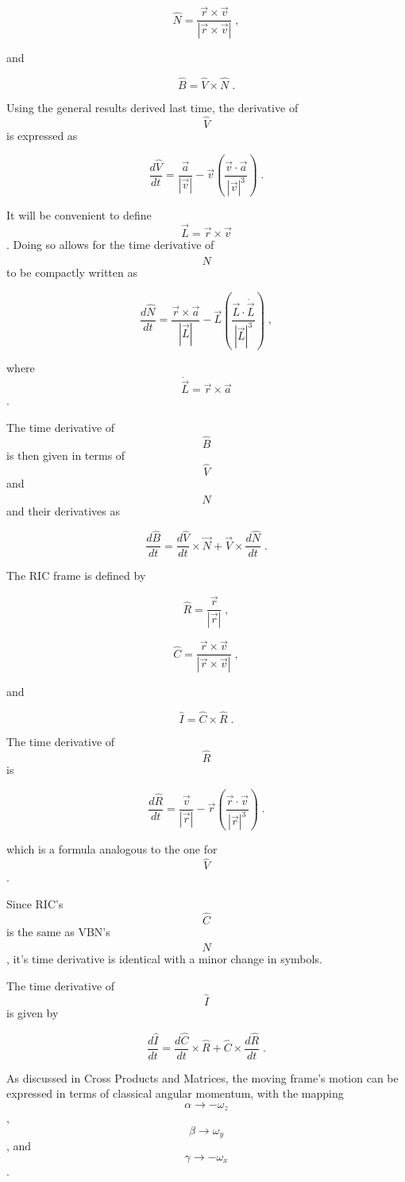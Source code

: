 \documentclass[10pt]{article}
\begin{document}
\[ \hat N = \frac{ \vec r \times \vec v }{ | \vec r \times \vec v | } \;, \]

and

\[ \hat B = \hat V \times \hat N \; .\]

Using the general results derived last time, the derivative of $$\hat V$$ is expressed as 

\[ \frac{d \hat V}{dt}  = \frac{\vec a}{|\vec v|} - \vec v \left( \frac{\vec v \cdot \vec a}{|\vec v|^3} \right) \; .\]

It will be convenient to define $$\vec L = \vec r \times \vec v$$.  Doing so allows for the time derivative of $$\hat N$$ to be compactly written as

\[ \frac{d \hat N}{dt} = \frac{\vec r \times \vec a}{|\vec L|} - \vec L \left( \frac{\vec L \cdot \dot{\vec L}}{|\vec L|^3} \right) \; ,\]

where $$\dot{\vec L} = \vec r \times \vec a$$.

The time derivative of $$\hat B$$ is then given in terms of $$\hat V$$ and $$\hat N$$ and their derivatives as 

\[ \frac{d \hat B}{d t} = \frac{d \hat V}{d t} \times \vec N + \vec V \times \frac{d \hat N}{d t} \; .\]

The RIC frame is defined by 

\[ \hat R = \frac{\vec r}{|\vec r|} \; ,\]

\[ \hat C =  \frac{ \vec r \times \vec v }{ | \vec r \times \vec v | } \; ,\]

and 

\[ \hat I = \hat C \times \hat R \; .\]

The time derivative of $$\hat R$$ is 

\[ \frac{d \hat R}{dt}  = \frac{\vec v}{|\vec r|} - \vec r \left( \frac{\vec r \cdot \vec v}{|\vec r|^3} \right) \; .\]

which is a formula analogous to the one for $$\hat V$$. 

Since RIC's $$\hat C$$ is the same as VBN's $$\hat N$$, it's time derivative is identical with a minor change in symbols.

The time derivative of $$\hat I$$ is given by 

\[ \frac{d \hat I}{d t} = \frac{d \hat C}{dt} \times \hat R + \hat C \times \frac{d \hat R}{dt} \; .\]

As discussed in Cross Products and Matrices, the moving frame's motion can be expressed in terms of classical angular momentum, with the mapping $$\alpha \rightarrow -\omega_z$$, $$\beta \rightarrow \omega_y$$, and $$\gamma \rightarrow - \omega_x$$.  
\end{document}
